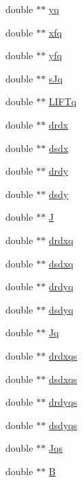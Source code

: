 \begin{DoxyCompactItemize}
\item 
double $\ast$$\ast$ \hyperlink{a00758_aa6ae1b8d3eae8c0c3326c02cae2fdafe}{yq}
\item 
double $\ast$$\ast$ \hyperlink{a00758_ab0b1aba5302da3a36486b7cd045eec04}{xfq}
\item 
double $\ast$$\ast$ \hyperlink{a00758_a97add37b674ff45f064f27235667dc7a}{yfq}
\item 
double $\ast$$\ast$ \hyperlink{a00758_a1bd7e549c8d4bcdcd1680868f78126ae}{s\+Jq}
\item 
double $\ast$$\ast$ \hyperlink{a00758_a4a3220ecdc6692cfbb576fb3cb62b9cd}{L\+I\+F\+Tq}
\item 
double $\ast$$\ast$ \hyperlink{a00758_a0a5f0da54a1e765c21c90f8704ff3f93}{drdx}
\item 
double $\ast$$\ast$ \hyperlink{a00758_a575e3552c50ea260e6a95a1471cd163a}{dsdx}
\item 
double $\ast$$\ast$ \hyperlink{a00758_aa3d97f0cda60dac5687fa5f1d98f4b1a}{drdy}
\item 
double $\ast$$\ast$ \hyperlink{a00758_a8d433d901ba70179974dec2026163192}{dsdy}
\item 
double $\ast$$\ast$ \hyperlink{a00758_a6069b658349cb95fc5737e033d9fd24c}{J}
\item 
double $\ast$$\ast$ \hyperlink{a00758_a9fa716db909471c9fc9aa6d0f2280101}{drdxq}
\item 
double $\ast$$\ast$ \hyperlink{a00758_a36f6ab30f4e5b8ec534f81ce63812262}{dsdxq}
\item 
double $\ast$$\ast$ \hyperlink{a00758_a32c28f540d4467ce602db92dfdef992d}{drdyq}
\item 
double $\ast$$\ast$ \hyperlink{a00758_a3227c5f843fffc8e1c2be8d3b3efeace}{dsdyq}
\item 
double $\ast$$\ast$ \hyperlink{a00758_a6dab6878f4e2fd680998ba16b57c5153}{Jq}
\item 
double $\ast$$\ast$ \hyperlink{a00758_a97973e455e82d93f0c486b7c7f63ae3e}{drdxqs}
\item 
double $\ast$$\ast$ \hyperlink{a00758_a65b12807391cfa9f9f9505746d491c08}{dsdxqs}
\item 
double $\ast$$\ast$ \hyperlink{a00758_aaac3101f9cee8db46ec11c96957385ba}{drdyqs}
\item 
double $\ast$$\ast$ \hyperlink{a00758_adece8fddf305c02dd188f0c0b8df0c6b}{dsdyqs}
\item 
double $\ast$$\ast$ \hyperlink{a00758_a26361b79040df0e24b62a32871b47860}{Jqs}
\item 
double $\ast$$\ast$ \hyperlink{a00758_a05a280ab7b2cad4d63fb711e212d4659}{B}
$$
\end{DoxyCompactItemize}
